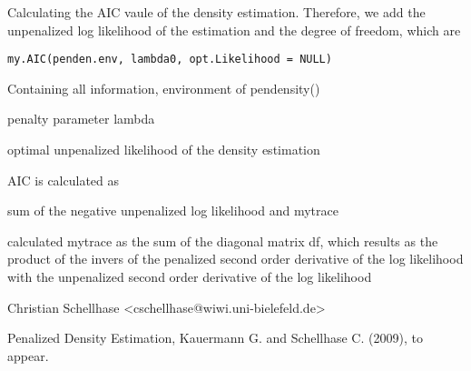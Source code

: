 \begin{Description}\relax
Calculating the AIC vaule of the density estimation. Therefore, we add the unpenalized log likelihood of the estimation and the degree of freedom, which are
\end{Description}
\begin{Usage}
\begin{verbatim}
my.AIC(penden.env, lambda0, opt.Likelihood = NULL)
\end{verbatim}
\end{Usage}
\begin{Arguments}
\begin{ldescription}
\item[\code{penden.env}] Containing all information, environment of pendensity()
\item[\code{lambda0}] penalty parameter lambda
\item[\code{opt.Likelihood}] optimal unpenalized likelihood of the density estimation
\end{ldescription}
\end{Arguments}
\begin{Details}\relax
AIC is calculated as
\end{Details}
\begin{Value}
\begin{ldescription}
\item[\code{myAIC}] sum of the negative unpenalized log likelihood and mytrace
\item[\code{mytrace}] calculated mytrace as the sum of the diagonal matrix df, which results as the product of the invers of the penalized second order derivative of the log likelihood with the unpenalized second order derivative of the log likelihood
\end{ldescription}
\end{Value}
\begin{Author}\relax
Christian Schellhase <cschellhase@wiwi.uni-bielefeld.de>
\end{Author}
\begin{References}\relax
Penalized Density Estimation, Kauermann G. and Schellhase C. (2009), to appear.
\end{References}

